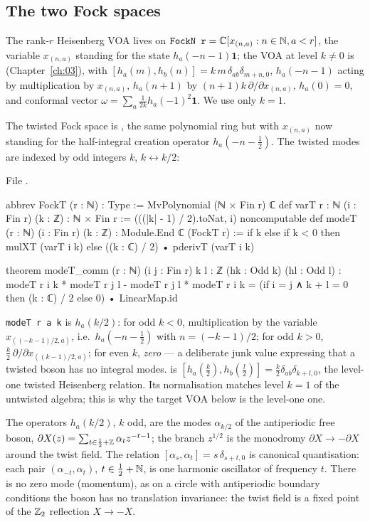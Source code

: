 \subsection{The two Fock spaces}\label{ch07:sec:fock}

The rank-$r$ Heisenberg VOA lives on $\lean{FockN r} = \C[x_{(n,a)} : n\in\N, a<r]$, the
variable $x_{(n,a)}$ standing for the state $h_a(-n-1)\mathbf 1$; the VOA at level $k\ne0$ is
 (Chapter~\ref{ch:03}), with
$[h_a(m),h_b(n)] = k\,m\,\delta_{ab}\delta_{m+n,0}$, $h_a(-n-1)$ acting by multiplication by
$x_{(n,a)}$, $h_a(n+1)$ by $(n+1)k\,\partial/\partial x_{(n,a)}$, $h_a(0)=0$, and conformal vector
$\omega = \sum_a \frac1{2k}h_a(-1)^2\mathbf 1$. We use only $k=1$.

The twisted Fock space is , the same polynomial ring but with $x_{(n,a)}$ now
standing for the half-integral creation operator $h_a(-n-\frac12)$. The twisted modes are indexed
by odd integers $k$, $k\leftrightarrow k/2$:

\noindent File .
\begin{leancode}
abbrev FockT (r : ℕ) : Type := MvPolynomial (ℕ × Fin r) ℂ
def varT {r : ℕ} (i : Fin r) (k : ℤ) : ℕ × Fin r := (((|k| - 1) / 2).toNat, i)
noncomputable def modeT (r : ℕ) (i : Fin r) (k : ℤ) : Module.End ℂ (FockT r) :=
  if k %
  else if k < 0 then mulXT (varT i k)
  else ((k : ℂ) / 2) • pderivT (varT i k)

theorem modeT_comm (r : ℕ) (i j : Fin r) {k l : ℤ} (hk : Odd k) (hl : Odd l) :
    modeT r i k * modeT r j l - modeT r j l * modeT r i k
      = (if i = j ∧ k + l = 0 then (k : ℂ) / 2 else 0) • LinearMap.id
\end{leancode}

\begin{dictionary}
\verb|modeT r a k| is $h_a(k/2)$: for odd $k<0$, multiplication by the variable
$x_{((-k-1)/2,a)}$, i.e.\ $h_a(-n-\frac12)$ with $n=(-k-1)/2$; for odd $k>0$, $\frac k2\,\partial/
\partial x_{((k-1)/2,a)}$; for even $k$, \emph{zero} --- a deliberate junk value expressing that a
twisted boson has no integral modes.  is
$[h_a(\tfrac k2),h_b(\tfrac l2)] = \tfrac k2\delta_{ab}\delta_{k+l,0}$, the level-one twisted
Heisenberg relation. Its normalisation matches level $k=1$ of the untwisted algebra; this is why
the target VOA below is the level-one one.
\end{dictionary}

\begin{physics}
The operators $h_a(k/2)$, $k$ odd, are the modes $\alpha_{k/2}$ of the antiperiodic free boson, $\partial X(z)=\sum_{t\in\frac12+{\mathbb{Z}}}\alpha_tz^{-t-1}$; the branch $z^{1/2}$ is the monodromy $\partial X\to-\partial X$ around the twist field. The relation $[\alpha_s,\alpha_t]=s\,\delta_{s+t,0}$ is canonical quantisation: each pair $(\alpha_{-t},\alpha_t)$, $t\in\tfrac12+{\mathbb{N}}$, is one harmonic oscillator of frequency $t$. There is no zero mode (momentum), as on a circle with antiperiodic boundary conditions the boson has no translation invariance: the twist field is a fixed point of the ${\mathbb{Z}}_2$ reflection $X\to-X$.
\end{physics}

